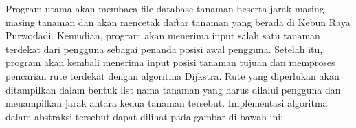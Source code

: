 \documentclass[conference]{IEEEtran}
\begin{document}
	Program utama akan membaca file database tanaman beserta jarak masing-masing tanaman dan akan mencetak daftar tanaman yang berada di Kebun Raya Purwodadi. Kemudian, program akan menerima input salah satu tanaman terdekat dari pengguna sebagai penanda posisi awal pengguna. Setelah itu, program akan kembali menerima input posisi tanaman tujuan dan memproses pencarian rute terdekat dengan algoritma Dijkstra. Rute yang diperlukan akan ditampilkan dalam bentuk list nama tanaman yang harus dilalui pengguna dan menampilkan jarak antara kedua tanaman tersebut. Implementasi algoritma dalam abstraksi tersebut dapat dilihat pada gambar di bawah ini:
	\begin{algorithm}[!ht]
	
	  \begin{center}
  	  \end{center}
  		    
	\end{algorithm}
\end{document}
